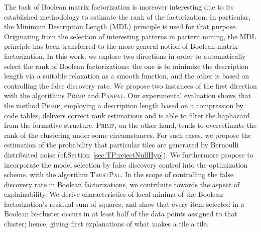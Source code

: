 The task of Boolean matrix factorization is moreover interesting due to its established methodology to estimate the rank of the factorization. In particular, the Minimum Description Length (MDL) principle is used for that purpose. Originating from the selection of interesting patterns in pattern mining, the MDL principle has been transferred to the more general notion of Boolean matrix factorization. In this work, we explore two directions in order to automatically select the rank of Boolean factorizations: the one is to minimize the description length via a suitable relaxation as a smooth \KL function, and the other is based on controlling the false discovery rate. We propose two instances of the first direction with the algorithms \textsc{Primp} and \textsc{Panpal}. Our experimental evaluation shows that the method \textsc{Primp}, employing a description length based on a compression by code tables, delivers correct rank estimations and is able to filter the haphazard from the formative structure. \textsc{Primp}, on the other hand, tends to overestimate the rank of the clustering under some circumstances. For such cases, we propose the estimation of the probability that particular tiles are generated by Bernoulli distributed noise (cf.\@ Section~\ref{sec:TP:rejectNullHyp}). We furthermore propose to incorporate the model selection by false discovery control into the optimization scheme, with the algorithm \textsc{TrustPal}. In the scope of controlling the false discovery rate in Boolean factorizations, we contribute towards the aspect of explainability. We derive characteristics of local minima of the Boolean factorization's residual sum of squares, and show that every item selected in a Boolean bi-cluster occurs in at least half of the data points assigned to that cluster; hence, giving first explanations of what makes a tile a tile.

